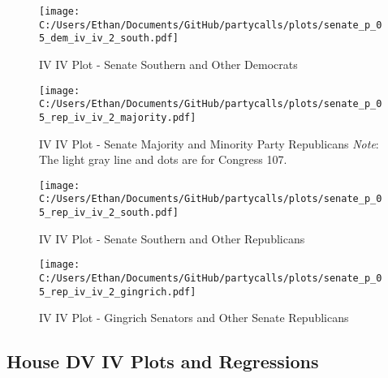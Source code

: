 \documentclass[12pt]{article}
\begin{document}
\begin{figure}[!htbp]
	\caption{IV IV Plot - Senate Southern and Other Democrats}
	\texttt{[image: C:/Users/Ethan/Documents/GitHub/partycalls/plots/senate\_p\_05\_dem\_iv\_iv\_2\_south.pdf]}
\end{figure}

\begin{figure}[!htbp]
	\caption{IV IV Plot - Senate Majority and Minority Party Republicans \textit{Note}: The light gray line and dots are for Congress 107.}
	\texttt{[image: C:/Users/Ethan/Documents/GitHub/partycalls/plots/senate\_p\_05\_rep\_iv\_iv\_2\_majority.pdf]}
\end{figure}

\begin{figure}[!htbp]
	\caption{IV IV Plot - Senate Southern and Other Republicans}
	\texttt{[image: C:/Users/Ethan/Documents/GitHub/partycalls/plots/senate\_p\_05\_rep\_iv\_iv\_2\_south.pdf]}
\end{figure}

\begin{figure}[!htbp]
	\caption{IV IV Plot - Gingrich Senators and Other Senate Republicans}
	\texttt{[image: C:/Users/Ethan/Documents/GitHub/partycalls/plots/senate\_p\_05\_rep\_iv\_iv\_2\_gingrich.pdf]}
\end{figure}

\subsection{House DV IV Plots and Regressions}
\end{document}
